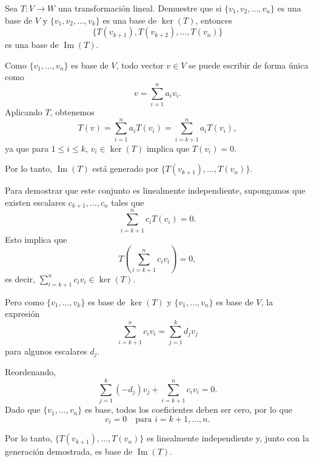 \begin{prob}
Sea $T: V \rightarrow W$ una transformación lineal. Demuestre que si $\{v_1, v_2, \dots, v_n\}$ es una base de $V$ y $\{v_1, v_2, \dots, v_k\}$ es una base de $\ker(T)$, entonces 
\[
\{T(v_{k+1}), T(v_{k+2}), \dots, T(v_n)\}
\]
es una base de $\operatorname{Im}(T)$.
\begin{myproof}
Como $\{v_1, \dots, v_n\}$ es base de $V$, todo vector $v \in V$ se puede escribir de forma única como
\[
v = \sum_{i=1}^n a_i v_i.
\]
Aplicando $T$, obtenemos
\[
T(v) = \sum_{i=1}^n a_i T(v_i) = \sum_{i=k+1}^n a_i T(v_i),
\]
ya que para $1 \leq i \leq k$, $v_i \in \ker(T)$ implica que $T(v_i) = 0$.

Por lo tanto, $\operatorname{Im}(T)$ está generado por $\{T(v_{k+1}), \dots, T(v_n)\}$.

Para demostrar que este conjunto es linealmente independiente, supongamos que existen escalares $c_{k+1}, \dots, c_n$ tales que
\[
\sum_{i=k+1}^n c_i T(v_i) = 0.
\]
Esto implica que
\[
T\left(\sum_{i=k+1}^n c_i v_i\right) = 0,
\]
es decir, $\sum_{i=k+1}^n c_i v_i \in \ker(T)$.

Pero como $\{v_1, \dots, v_k\}$ es base de $\ker(T)$ y $\{v_1, \dots, v_n\}$ es base de $V$, la expresión
\[
\sum_{i=k+1}^n c_i v_i = \sum_{j=1}^k d_j v_j
\]
para algunos escalares $d_j$.

Reordenando,
\[
\sum_{j=1}^k (-d_j) v_j + \sum_{i=k+1}^n c_i v_i = 0.
\]
Dado que $\{v_1, \dots, v_n\}$ es base, todos los coeficientes deben ser cero, por lo que
\[
c_i = 0 \quad \text{para } i = k+1, \dots, n.
\]

Por lo tanto, $\{T(v_{k+1}), \dots, T(v_n)\}$ es linealmente independiente y, junto con la generación demostrada, es base de $\operatorname{Im}(T)$.
\end{myproof}
\end{prob}


